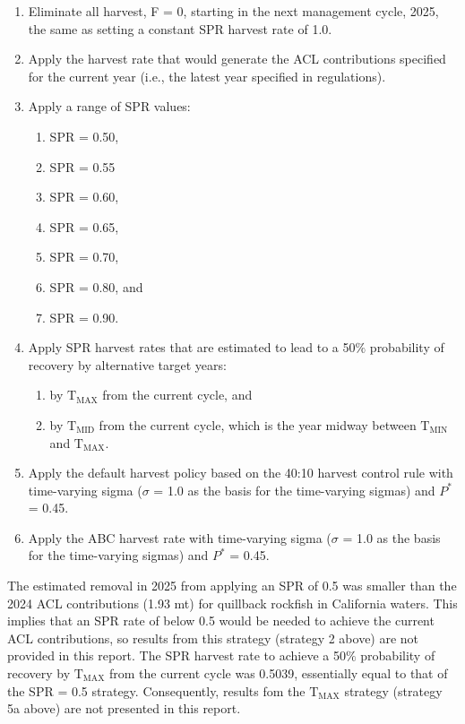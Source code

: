 \documentclass[11pt,
  letterpaper,
]{article}
\begin{document}
\begin{enumerate}
    \item Eliminate all harvest, F = 0, starting in the next management cycle, 2025, the same as setting a constant SPR harvest rate of 1.0.
    \item Apply the harvest rate that would generate the ACL contributions specified for the current year (i.e., the latest year specified in regulations). 
    \item Apply a range of SPR values: 
    \begin{enumerate}
     \item SPR = 0.50,
     \item SPR = 0.55
     \item SPR = 0.60,
     \item SPR = 0.65,
     \item SPR = 0.70,
     \item SPR = 0.80, and
     \item SPR = 0.90. 
    \end{enumerate}
    \item Apply SPR harvest rates that are estimated to lead to a 50$\%$ probability of recovery by alternative target years: 
    \begin{enumerate}
     \item by $\text{T}_\text{MAX}$ from the current cycle, and 
     \item by $\text{T}_\text{MID}$ from the current cycle, which is the year midway between $\text{T}_\text{MIN}$ and $\text{T}_\text{MAX}$.
    \end{enumerate}
    \item Apply the default harvest policy based on the 40:10 harvest control rule with time-varying sigma ($\sigma$ = 1.0 as the basis for the time-varying sigmas) and $P^*$ = 0.45.
    \item Apply the ABC harvest rate with time-varying sigma ($\sigma$ = 1.0 as the basis for the time-varying sigmas) and $P^*$ = 0.45.
\end{enumerate}

The estimated removal in 2025 from applying an SPR of 0.5 was smaller than the 2024 ACL contributions (1.93 mt) for quillback rockfish in California waters. This implies that an SPR rate of below 0.5 would be needed to achieve the current ACL contributions, so results from this strategy (strategy 2 above) are not provided in this report. The SPR harvest rate to achieve a 50\(\%\) probability of recovery by \(\text{T}_\text{MAX}\) from the current cycle was 0.5039, essentially equal to that of the SPR = 0.5 strategy. Consequently, results fom the \(\text{T}_\text{MAX}\) strategy (strategy 5a above) are not presented in this report.
\end{document}
